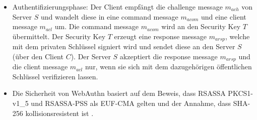 \begin{itemize}
    \item Authentifizierungsphase:
    Der Client empfängt die challenge message $m_{ach}$ von Server $S$ und wandelt diese in eine command message $m_{acom}$ und eine client message $m_{acl}$ um. Die command message $m_{acom}$ wird an den Security Key $T$ übermittelt. Der Security Key $T$ erzeugt eine response message $m_{arsp}$, welche mit dem privaten Schlüssel signiert wird und sendet diese an den Server $S$ (über den Client $C$). Der Server $S$ akzeptiert die response message $m_{arsp}$ und die client message $m_{acl}$ nur, wenn sie sich mit dem dazugehörigen öffentlichen Schlüssel verifizieren lassen. \cite{bindel2022fido2}
    \item Die Sicherheit von WebAuthn basiert auf dem Beweis, dass RSASSA PKCS1-v1\_5 und RSASSA-PSS als \ac{EUF-CMA} gelten und der Annahme, dass SHA-256 kollisionsresistent ist \cite{barbosa2021provable}.
\end{itemize}


